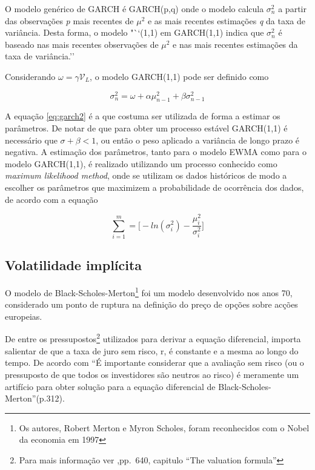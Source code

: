 \documentclass[
  12pt,
  a4paper,
  openany]{book}
\begin{document}
O modelo genérico de GARCH é GARCH(p,q) onde o modelo calcula \(\sigma_{n}^{2}\) a partir das observações \emph{p} mais recentes de \(\mu^2\) e as mais recentes estimações \emph{q} da taxa de variância. Desta forma, o modelo "``(1,1) em GARCH(1,1) indica que \(\sigma_{n}^{2}\) é baseado nas mais recentes observações de \(\mu^2\) e nas mais recentes estimações da taxa de variância.''\citep[p.227]{Hull2018}

Considerando \(\omega=\gamma\mathcal{V}_{L}\), o modelo GARCH(1,1) pode ser definido como

\begin{equation} 
  \sigma_{n}^{2} = \omega + \alpha\mu_{n-1}^{2} + \beta\sigma_{n-1}^{2}
  \label{eq:garch2}
\end{equation}

A equação \eqref{eq:garch2} é a que costuma ser utilizada de forma a estimar os parâmetros. De notar de que para obter um processo estável GARCH(1,1) é necessário que \(\sigma+\beta<1\), ou então o peso aplicado a variância de longo prazo é negativa.
A estimação dos parâmetros, tanto para o modelo EWMA como para o modelo GARCH(1,1), é realizado utilizando um processo conhecido como \emph{maximum likelihood method}, onde se utilizam os dados históricos de modo a escolher os parâmetros que maximizem a probabilidade de ocorrência dos dados, de acordo com a equação

\begin{equation} 
  \sum_{i=1}^{m}=\bigg[-ln(\sigma_{i}^{2})-\frac{\mu_{i}^{2}}{\sigma_{i}^{2}}\bigg]
  \label{eq:mgarch}
\end{equation}

\hypertarget{volatilidade-impluxedcita}{%
\subsection{Volatilidade implícita}\label{volatilidade-impluxedcita}}

O modelo de Black-Scholes-Merton\footnote{Os autores, Robert Merton e Myron Scholes, foram reconhecidos com o Nobel da economia em 1997} foi um modelo desenvolvido nos anos 70, considerado um ponto de ruptura na definição do preço de opções sobre acções europeias.

De entre os pressupostos\footnote{Para mais informação ver \citet{BlackScholes},pp.~640, capitulo ``The valuation formula''} utilizados para derivar a equação diferencial, importa salientar de que a taxa de juro sem risco, r, é constante e a mesma ao longo do tempo. De acordo com \citet{Hull2018} ``É importante considerar que a avaliação sem risco (ou o pressuposto de que todos os investidores são neutros ao risco) é meramente um artifício para obter solução para a equação diferencial de Black-Scholes-Merton''(p.312).
\end{document}
